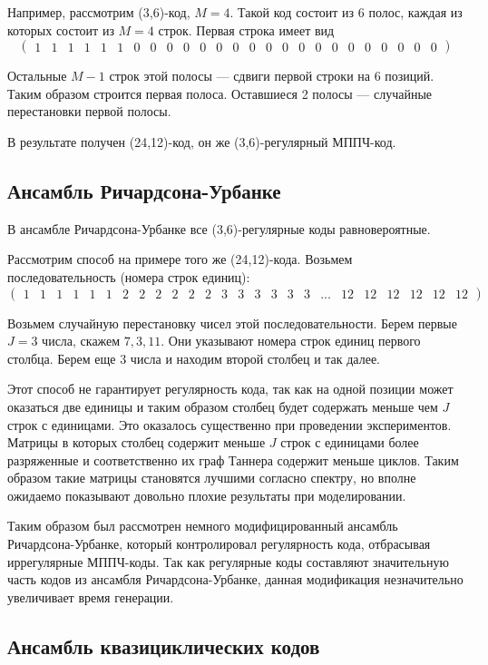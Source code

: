 Например, рассмотрим (3,6)-код, $M=4$. Такой код состоит из 6 полос, каждая из которых состоит
из $M=4$ строк. Первая строка имеет вид
\setcounter{MaxMatrixCols}{30}
\[
\begin{pmatrix}
1 & 1 & 1 & 1 & 1 & 1 & 0 & 0 & 0 & 0 & 0 & 0 & 0 & 0 & 0 & 0 & 0 & 0 & 0 & 0 & 0 & 0 & 0 & 0 & 0
\end{pmatrix}
\]

Остальные $M-1$ строк этой полосы --- сдвиги первой строки на 6 позиций. Таким образом строится первая
полоса. Оставшиеся 2 полосы --- случайные перестановки первой полосы.

В результате получен (24,12)-код, он же (3,6)-регулярный МППЧ-код.

\subsection{Ансамбль Ричардсона-Урбанке}

В ансамбле Ричардсона-Урбанке все (3,6)-регулярные коды равновероятные.

Рассмотрим способ на примере того же (24,12)-кода.
Возьмем последовательность (номера строк единиц):
\[
\begin{pmatrix}
	1 & 1 & 1 & 1 & 1 & 1 & 2 & 2 & 2 & 2 & 2 & 2 & 3 & 3 & 3 & 3 & 3 & 3 & ... & 12 & 12 & 12 & 12 & 12 & 12
\end{pmatrix}
\]

Возьмем случайную перестановку чисел этой последовательности.
Берем первые $J=3$ числа, скажем $7,3,11$. Они указывают номера строк единиц
первого столбца. Берем еще 3 числа и находим второй столбец и так далее.

Этот способ не гарантирует регулярность кода, так как на одной позиции может оказаться две единицы
и таким образом столбец будет содержать меньше чем $J$ строк с единицами. Это оказалось существенно при
проведении экспериментов. Матрицы в которых столбец содержит меньше $J$ строк с единицами
более разряженные и соответственно их граф Таннера содержит меньше циклов. Таким образом такие матрицы
становятся лучшими согласно спектру, но вполне ожидаемо показывают довольно плохие результаты при моделировании.

Таким образом был рассмотрен немного модифицированный ансамбль Ричардсона-Урбанке, который контролировал
регулярность кода, отбрасывая иррегулярные МППЧ-коды. Так как регулярные коды составляют значительную
часть кодов из ансамбля Ричардсона-Урбанке, данная модификация незначительно увеличивает время генерации.
\subsection{Ансамбль квазициклических кодов}

